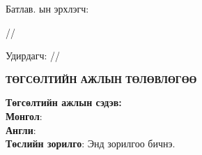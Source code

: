 
\begin{titlepage}
	\noindent Батлав. \deptname ын эрхлэгч: 
	\begin{flushright}
		\makebox[6cm]{\dotfill} /\chairname/ 
	\end{flushright} 
	Удирдагч:\makebox[6cm]{ \dotfill} /\supname/
	\begin{center}
		\vspace*{0.5cm}
		\textbf{{\large ТӨГСӨЛТИЙН АЖЛЫН ТӨЛӨВЛӨГӨӨ}}\\[0.5cm]
	\end{center}
	\noindent \textbf{Төгсөлтийн ажлын сэдэв:}\\
	\textbf{Монгол}: \ttitle\\
	\textbf{Англи}: \ttitleng\\
	
	\noindent \textbf{Төслийн зорилго}: Энд зорилгоо бичнэ.\\
	

\end{titlepage}

